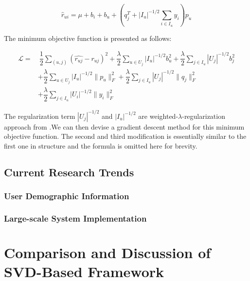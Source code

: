 \documentclass[letter paper, 11pt]{article}
\begin{document}
	\begin{equation}
		\hat{r}_{ui} = \mu + b_i + b_u  + (q_j^T + |I_u|^{-1/2}\sum_{i \in I_u} y_i) p_u
	\end{equation}
	
	The minimum objective function is presented as follows:
	
	\begin{equation}
		\begin{split}
			\mathcal{L} = &\ \dfrac{1}{2} \sum_{(u, j)} (\hat{r_{uj}} - r_{uj})^2 + \dfrac{\lambda}{2} \sum_{u \in U_j} |I_u|^{-1/2} b_u^2 + \dfrac{\lambda}{2} \sum_{j \in I_u} |U_j|^{-1/2} b_j^2 \\
			& + \dfrac{\lambda}{2} \sum_{u \in U_j} |I_u|^{-1/2} \|p_u\|_F^{2} + \dfrac{\lambda}{2} \sum_{j \in I_u} |U_j|^{-1/2} \|q_j\|_F^{2} \\
			& + \dfrac{\lambda}{2} \sum_{j \in I_u} |U_i|^{-1/2} \|y_i\|_F^{2}
		\end{split}
	\end{equation}
	
	The regularization term $|U_j|^{-1/2}$ and $|I_u|^{-1/2}$ are weighted-$\lambda$-regularization approach from .We can then devise a gradient descent method for this minimum objective function. The second and third modification is essentially similar to the first one in structure and the formula is omitted here for brevity.
	
	
	\subsection{Current Research Trends}
	\subsubsection{User Demographic Information}
	
	
	\subsubsection{Large-scale System Implementation}
	
	\section{Comparison and Discussion of SVD-Based Framework}
	
\end{document}
